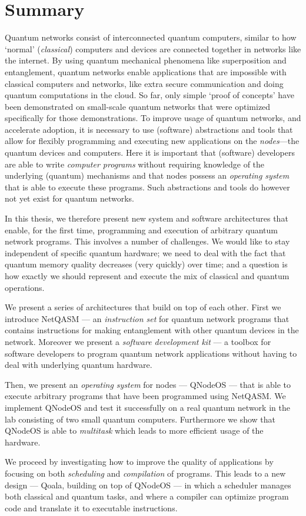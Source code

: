\chapter*{Summary}

Quantum networks consist of interconnected quantum computers, similar to how `normal' (\emph{classical}) computers and devices are connected together in networks like the internet.
By using quantum mechanical phenomena like superposition and entanglement, quantum networks enable applications that are impossible with classical computers and networks, like extra secure communication and doing quantum computations in the cloud.
So far, only simple `proof of concepts' have been demonstrated on small-scale quantum networks that were optimized specifically for those demonstrations.
To improve usage of quantum networks, and accelerate adoption, it is necessary to use (software) abstractions and tools that allow for flexibly programming and executing new applications on the \emph{nodes}---the quantum devices and computers.
Here it is important that (software) developers are able to write \emph{computer programs} without requiring knowledge of the underlying (quantum) mechanisms and that nodes possess an \emph{operating system} that is able to execute these programs.
Such abstractions and tools do however not yet exist for quantum networks.

In this thesis, we therefore present new system and software architectures that enable, for the first time, programming and execution of arbitrary quantum network programs.
This involves a number of challenges.
We would like to stay independent of specific quantum hardware; we need to deal with the fact that quantum memory quality decreases (very quickly) over time; and a question is how exactly we should represent and execute the mix of classical and quantum operations.

We present a series of architectures that build on top of each other.
First we introduce NetQASM --- an \emph{instruction set} for quantum network programs that contains instructions for making entanglement with other quantum devices in the network.
Moreover we present a \emph{software development kit} --- a toolbox for software developers to program quantum network applications without having to deal with underlying quantum hardware.

Then, we present an \emph{operating system} for nodes --- QNodeOS --- that is able to execute arbitrary programs that have been programmed using NetQASM.
We implement QNodeOS and test it successfully on a real quantum network in the lab consisting of two small quantum computers.
Furthermore we show that QNodeOS is able to \emph{multitask} which leads to more efficient usage of the hardware.

We proceed by investigating how to improve the quality of applications by focusing on both \emph{scheduling} and \emph{compilation} of programs.
This leads to a new design --- Qoala, building on top of QNodeOS --- in which a scheduler manages both classical and quantum tasks, and where a compiler can optimize program code and translate it to executable instructions.

